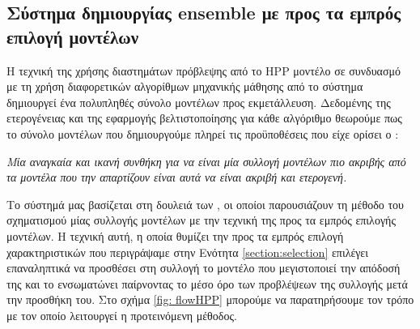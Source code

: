 \subsection{Σύστημα δημιουργίας ensemble με προς τα εμπρός επιλογή μοντέλων} Η τεχνική της χρήσης διαστημάτων πρόβλεψης από το HPP μοντέλο σε συνδυασμό με τη χρήση διαφορετικών αλγορίθμων μηχανικής μάθησης από το σύστημα δημιουργεί ένα πολυπληθές σύνολο μοντέλων προς εκμετάλλευση. Δεδομένης της ετερογένειας και της εφαρμογής βελτιστοποίησης για κάθε αλγόριθμο θεωρούμε πως το σύνολο μοντέλων που δημιουργούμε πληρεί τις προϋποθέσεις που είχε ορίσει ο \citet{Dietterich2000}:  

\begin{displayquote}
	\textit{Μία αναγκαία και ικανή συνθήκη για να είναι μία συλλογή μοντέλων πιο ακριβής από τα μοντέλα που την απαρτίζουν είναι αυτά να είναι ακριβή και ετερογενή.}
\end{displayquote}

Το σύστημά μας βασίζεται στη δουλειά των \citet{Caruana:2004:ESL:1015330.1015432}, οι οποίοι παρουσιάζουν τη μέθοδο του σχηματισμού μίας συλλογής μοντέλων με την τεχνική της προς τα εμπρός επιλογής μοντέλων. Η τεχνική αυτή, η οποία θυμίζει την προς τα εμπρός επιλογή χαρακτηριστικών που περιγράψαμε στην Ενότητα \ref{section:selection} επιλέγει επαναληπτικά να προσθέσει στη συλλογή το μοντέλο που μεγιστοποιεί την απόδοσή της και το ενσωματώνει παίρνοντας το μέσο όρο των προβλέψεων της συλλογής μετά την προσθήκη του. Στο σχήμα \ref{fig: flowHPP} μπορούμε να παρατηρήσουμε τον τρόπο με τον οποίο λειτουργεί η προτεινόμενη μέθοδος.


